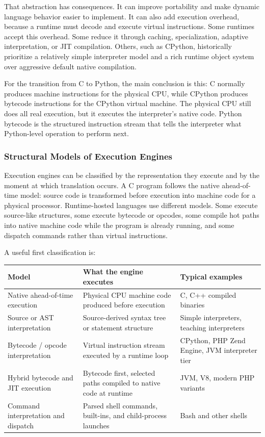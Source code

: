 \documentclass[a4paper,twoside]{report}
\begin{document}
That abstraction has consequences. It can improve portability and make dynamic language behavior easier to implement. It can also add execution overhead, because a runtime must decode and execute virtual instructions. Some runtimes accept this overhead. Some reduce it through caching, specialization, adaptive interpretation, or JIT compilation. Others, such as CPython, historically prioritize a relatively simple interpreter model and a rich runtime object system over aggressive default native compilation.

For the transition from C to Python, the main conclusion is this: C normally produces machine instructions for the physical CPU, while CPython produces bytecode instructions for the CPython virtual machine. The physical CPU still does all real execution, but it executes the interpreter's native code. Python bytecode is the structured instruction stream that tells the interpreter what Python-level operation to perform next.



\subsubsection{Structural Models of Execution Engines}

Execution engines can be classified by the representation they execute and by the moment at which translation occurs. A C program follows the native ahead-of-time model: source code is transformed before execution into machine code for a physical processor. Runtime-hosted languages use different models. Some execute source-like structures, some execute bytecode or opcodes, some compile hot paths into native machine code while the program is already running, and some dispatch commands rather than virtual instructions.

A useful first classification is:

\begin{center}
\begin{tabular}{|p{}|p{}|p{}|}
\hline
\textbf{Model} & \textbf{What the engine executes} & \textbf{Typical examples} \\
\hline
Native ahead-of-time execution & Physical CPU machine code produced before execution & C, C++ compiled binaries \\
\hline
Source or AST interpretation & Source-derived syntax tree or statement structure & Simple interpreters, teaching interpreters \\
\hline
Bytecode / opcode interpretation & Virtual instruction stream executed by a runtime loop & CPython, PHP Zend Engine, JVM interpreter tier \\
\hline
Hybrid bytecode and JIT execution & Bytecode first, selected paths compiled to native code at runtime & JVM, V8, modern PHP variants \\
\hline
Command interpretation and dispatch & Parsed shell commands, built-ins, and child-process launches & Bash and other shells \\
\hline
\end{tabular}
\end{center}
\end{document}
